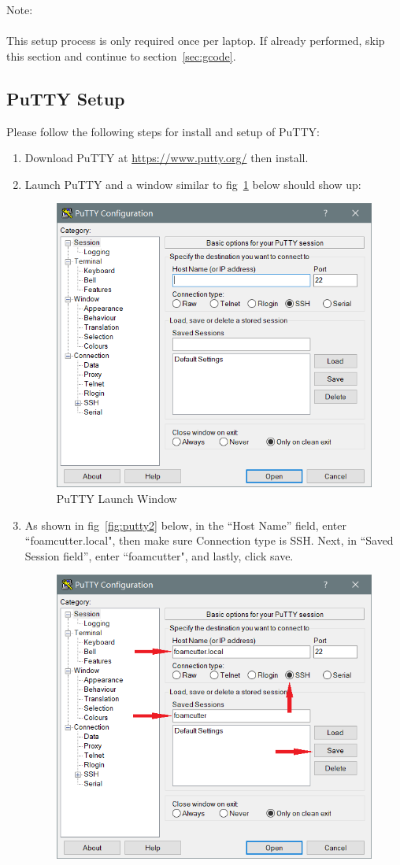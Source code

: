 \documentclass[titlepage,12pt,letter]{report}
\numberwithin{equation}{chapter}
\begin{document}
\begin{tcolorbox}
	{\large
		Note:\\ \\
		 This setup process is only required once per laptop. If already performed, skip this section and continue to section~\ref{sec:gcode}.
	}
\end{tcolorbox}

\subsection{PuTTY Setup}

\noindent Please follow the following steps for install and setup of PuTTY:

\begin{enumerate}[itemsep = 5pt,topsep=0pt]
	\item Download PuTTY at \href{https://www.putty.org/}{https://www.putty.org/} then install.
	\item Launch PuTTY and a window similar to fig~\ref{fig:putty1} below should show up:
	\begin{figure} [H]
		\includegraphics[width = 0.6\linewidth]{./Figures/Laptop_Setup/putty1.png}
		\caption{PuTTY Launch Window}
		\label{fig:putty1}
	\end{figure}
	\item As shown in fig~\ref{fig:putty2} below, in the ``Host Name'' field, enter ``foamcutter.local", then make sure Connection type is SSH. Next, in ``Saved Session field'', enter ``foamcutter", and lastly, click save.
	\begin{figure} [H]
		\includegraphics[width = 0.6\linewidth]{./Figures/Laptop_Setup/putty2.png}

\end{figure}
\end{enumerate}
\end{document}
